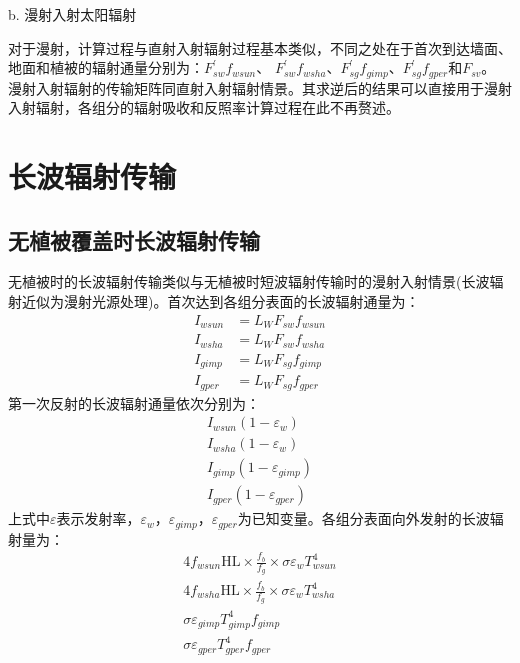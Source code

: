 b. 漫射入射太阳辐射

对于漫射，计算过程与直射入射辐射过程基本类似，不同之处在于首次到达墙面、地面和植被的辐射通量分别为：$F_{sw}^\prime f_{wsun}$、
$F_{sw}^\prime f_{wsha}$、$F_{sg}^\prime f_{gimp}$、$F_{sg}^\prime f_{gper}$和$F_{sv}$。
漫射入射辐射的传输矩阵同直射入射辐射情景。其求逆后的结果可以直接用于漫射入射辐射，各组分的辐射吸收和反照率计算过程在此不再赘述。 
\section{长波辐射传输}
\subsection{无植被覆盖时长波辐射传输}
无植被时的长波辐射传输类似与无植被时短波辐射传输时的漫射入射情景(长波辐射近似为漫射光源处理)。首次达到各组分表面的长波辐射通量为：
\begin{equation}
\begin{aligned} I_{wsun} &=L_{W} F_{s w} f_{wsun} \\ I_{wsha} &=L_{W} F_{s w} f_{wsha} \\ I_{gimp} &=L_{W} F_{s g} f_{gimp} \\ I_{gper} &=L_{W} F_{s g} f_{gper} \end{aligned}
\end{equation}
第一次反射的长波辐射通量依次分别为：
\begin{equation}
\begin{array}{c}I_{wsun}\left(1-\varepsilon_{w}\right) \\ I_{wsha}\left(1-\varepsilon_{w}\right) \\ I_{gimp}\left(1-\varepsilon_{gimp}\right) \\ I_{gper}\left(1-\varepsilon_{gper}\right)\end{array}
\end{equation}
上式中$\varepsilon$表示发射率，$\varepsilon_w$，$\varepsilon_{gimp}$，$\varepsilon_{gper}$为已知变量。各组分表面向外发射的长波辐射量为：
\begin{equation}
\begin{array}{c}4 f_{wsun} \mathrm{HL} \times \frac{f_{b}}{f_{g}} \times \sigma \varepsilon_{w} T_{wsun}^{4} \\
4 f_{wsha} \mathrm{HL} \times \frac{f_{b}}{f_{g}} \times \sigma \varepsilon_{w} T_{wsha}^{4} \\
\sigma \varepsilon_{gimp} T_{gimp}^{4} f_{gimp} \\
\sigma \varepsilon_{gper} T_{gper}^{4} f_{gper}\end{array}
\end{equation}
